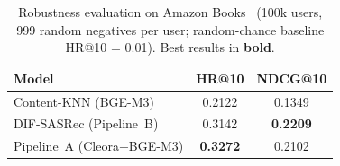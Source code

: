 \begin{table}[H]
\caption{Robustness evaluation on Amazon Books~\cite{hou2024amazon} (100k users, 999 random
         negatives per user; random-chance baseline HR@10 = 0.01).
         Best results in \textbf{bold}.}
\label{tab:robustness}
\centering
\begin{tabular}{lcc}
\toprule
\textbf{Model} & \textbf{HR@10} & \textbf{NDCG@10} \\
\midrule
Content-KNN (BGE-M3)       & 0.2122          & 0.1349          \\
DIF-SASRec (Pipeline~B)    & 0.3142          & \textbf{0.2209} \\
Pipeline~A (Cleora+BGE-M3) & \textbf{0.3272} & 0.2102          \\
\bottomrule
\end{tabular}
\end{table}
